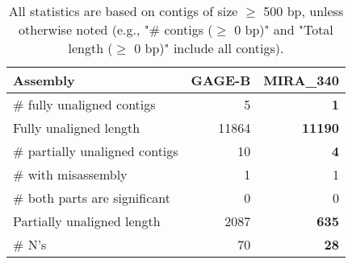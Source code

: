 \documentclass[12pt,a4paper]{article}
\begin{document}
\begin{table}[ht]
\begin{center}
\caption{All statistics are based on contigs of size $\geq$ 500 bp, unless otherwise noted (e.g., "\# contigs ($\geq$ 0 bp)" and "Total length ($\geq$ 0 bp)" include all contigs).}
\begin{tabular}{|l*{2}{|r}|}
\hline
Assembly & GAGE-B & MIRA\_340 \\ \hline
\# fully unaligned contigs & 5 & {\bf 1} \\ \hline
Fully unaligned length & 11864 & {\bf 11190} \\ \hline
\# partially unaligned contigs & 10 & {\bf 4} \\ \hline
\hspace{5mm}\# with misassembly & 1 & 1 \\ \hline
\hspace{5mm}\# both parts are significant & 0 & 0 \\ \hline
Partially unaligned length & 2087 & {\bf 635} \\ \hline
\# N's & 70 & {\bf 28} \\ \hline
\end{tabular}
\end{center}
\end{table}
\end{document}

